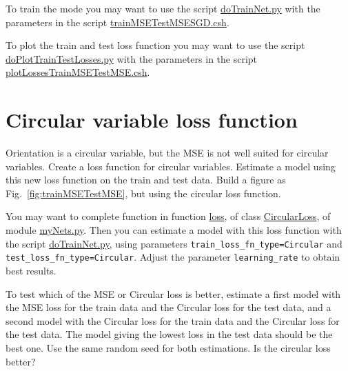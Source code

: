 \documentclass[12pt]{article}
\begin{document}
To train the mode you may want to use the script
\href{https://github.com/joacorapela/statNeuro2025/blob/master/worksheets/08_artificialNeuralNetworks/code/scripts/doTrainNet.py}{doTrainNet.py}
with the parameters in the script
\href{https://github.com/joacorapela/statNeuro2025/blob/master/worksheets/08_artificialNeuralNetworks/code/scripts/trainMSETestMSESGD.csh}{trainMSETestMSESGD.csh}.

To plot the train and test loss function you may want to use the script
\href{https://github.com/joacorapela/statNeuro2025/blob/master/worksheets/08_artificialNeuralNetworks/code/scripts/doPlotTrainTestLosses.py}{doPlotTrainTestLosses.py}
with the parameters in the script
\href{https://github.com/joacorapela/statNeuro2025/blob/master/worksheets/08_artificialNeuralNetworks/code/scripts/plotLossesTrainMSETestMSE.csh}{plotLossesTrainMSETestMSE.csh}.

\section{Circular variable loss function}

Orientation is a circular variable, but the MSE is not well suited for circular
variables. Create a loss function for circular variables. Estimate a model
using this new loss function on the train and test data. Build a figure as
Fig.~\ref{fig:trainMSETestMSE}, but using the circular loss function.

You may want to complete function in function
\href{https://github.com/joacorapela/statNeuro2025/blob/90b240fe0c8dc1f0bb0a48a0c5cc7e56754001a2/worksheets/08_artificialNeuralNetworks/code/scripts/myNets.py#L71}{loss},
of class
\href{https://github.com/joacorapela/statNeuro2025/blob/90b240fe0c8dc1f0bb0a48a0c5cc7e56754001a2/worksheets/08_artificialNeuralNetworks/code/scripts/myNets.py#L66}{CircularLoss},
of module
\href{https://github.com/joacorapela/statNeuro2025/blob/master/worksheets/08_artificialNeuralNetworks/code/scripts/myNets.py}{myNets.py}.
%
Then you can estimate a model with this loss function with the script
\href{https://github.com/joacorapela/statNeuro2025/blob/master/worksheets/08_artificialNeuralNetworks/code/scripts/doTrainNet.py}{doTrainNet.py},
using parameters \texttt{train\_loss\_fn\_type=Circular} and
\texttt{test\_loss\_fn\_type=Circular}. Adjust the parameter
\texttt{learning\_rate} to obtain best results.

To test which of the MSE or Circular loss is better, estimate a first model with
the MSE loss for the train data and the Circular loss for the test data,
and a second model with the Circular loss for the train data and the Circular
loss for the test data. The model giving the lowest loss in the test data
should be the best one. Use the same random seed for both estimations. Is the
circular loss better?
\end{document}
